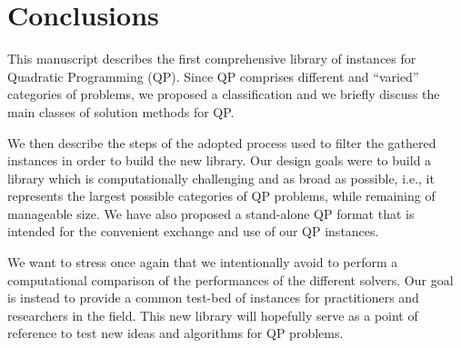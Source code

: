 \section{Conclusions}\label{sec:conclusions}

 This manuscript describes the first comprehensive library of instances for Quadratic Programming (QP). Since QP comprises  different and ``varied'' categories of problems, we proposed a classification and we briefly discuss the main classes of solution methods for QP.

We then describe the steps of the adopted process used to filter the gathered instances  in order to build the new library. Our design goals were to build a library which is computationally challenging and as broad as possible, i.e., it represents the largest possible categories of QP problems, while remaining of manageable size. We have also proposed a stand-alone QP format that is intended
for the convenient exchange and use of our QP instances.


We want to stress once again that we intentionally avoid to perform a computational comparison of the performances of the different solvers. Our goal is instead to provide a common test-bed of instances for practitioners and researchers in the field. This new library will hopefully serve as a point of reference to test new ideas and algorithms for QP problems.
